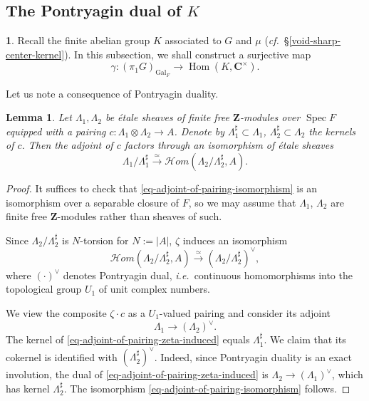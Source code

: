 \documentclass[10pt,english,reqno]{amsart}
\newcommand{\integers}{\mathbf Z}
\newcommand{\complexes}{\mathbf C}
\newcommand{\Gal}{\operatorname{Gal}}
\newcommand{\Hom}{\operatorname{Hom}}
\newcommand{\SHom}{\mathscr{H}om}
\newcommand{\Spec}{\operatorname{Spec}}
\newtheorem{lem}[subsubsection]{Lemma}
\theoremstyle{definition}
\numberwithin{equation}{section}
\newtheorem{untitledsubsubsection}[subsubsection]{}
\newenvironment{void}
{\begin{untitledsubsubsection}}
{\end{untitledsubsubsection}}
\begin{document}


\subsection{The Pontryagin dual of $K$}
\label{sec-pontryagin-dual-kernel}

\begin{void}
Recall the finite abelian group $K$ associated to $G$ and $\mu$ (\emph{cf.}~\S\ref{void-sharp-center-kernel}). In this subsection, we shall construct a surjective map
\begin{equation}
\label{eq-sharp-kernel-quotient-of-fundamental-group}
	\gamma : (\pi_1 G)_{\Gal_F} \rightarrow \Hom(K, \complexes^{\times}).
\end{equation}

Let us note a consequence of Pontryagin duality.
\end{void}


\begin{lem}
\label{lem-adjoint-of-pairing-isomorphism}
Let $\Lambda_1, \Lambda_2$ be \'etale sheaves of finite free $\integers$-modules over $\Spec F$ equipped with a pairing $c : \Lambda_1 \otimes \Lambda_2 \rightarrow A$. Denote by $\Lambda_1^{\sharp} \subset \Lambda_1$, $\Lambda_2^{\sharp} \subset \Lambda_2$ the kernels of $c$. Then the adjoint of $c$ factors through an isomorphism of \'etale sheaves
\begin{equation}
\label{eq-adjoint-of-pairing-isomorphism}
\Lambda_1/\Lambda_1^{\sharp} \xrightarrow{\simeq} \SHom(\Lambda_2/\Lambda_2^{\sharp}, A).
\end{equation}
\end{lem}
\begin{proof}
It suffices to check that \eqref{eq-adjoint-of-pairing-isomorphism} is an isomorphism over a separable closure of $F$, so we may assume that $\Lambda_1$, $\Lambda_2$ are finite free $\integers$-modules rather than sheaves of such.

Since $\Lambda_2/\Lambda^{\sharp}_2$ is $N$-torsion for $N := |A|$, $\zeta$ induces an isomorphism
$$
\SHom(\Lambda_2/\Lambda_2^{\sharp}, A) \xrightarrow{\simeq} (\Lambda_2/\Lambda_2^{\sharp})^{\vee},
$$
where $(\cdot)^{\vee}$ denotes Pontryagin dual, \emph{i.e.}~continuous homomorphisms into the topological group $U_1$ of unit complex numbers.

We view the composite $\zeta\cdot c$ as a $U_1$-valued pairing and consider its adjoint
\begin{equation}
\label{eq-adjoint-of-pairing-zeta-induced}
	\Lambda_1 \rightarrow (\Lambda_2)^{\vee}.
\end{equation}
The kernel of \eqref{eq-adjoint-of-pairing-zeta-induced} equals $\Lambda_1^{\sharp}$. We claim that its cokernel is identified with $(\Lambda_2^{\sharp})^{\vee}$. Indeed, since Pontryagin duality is an exact involution, the dual of \eqref{eq-adjoint-of-pairing-zeta-induced} is $\Lambda_2 \rightarrow (\Lambda_1)^{\vee}$, which has kernel $\Lambda^{\sharp}_2$. The isomorphism \eqref{eq-adjoint-of-pairing-isomorphism} follows.
\end{proof}
\end{document}
